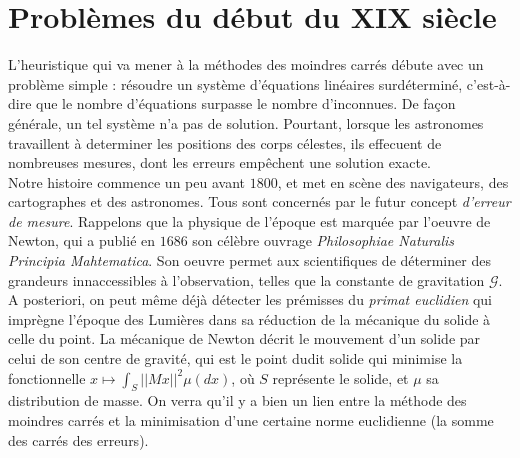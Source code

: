 \documentclass{article}
\begin{document}
\section{Problèmes du début du XIX siècle}

L'heuristique qui va mener à la méthodes des moindres carrés débute avec un problème simple : résoudre un système d'équations linéaires surdéterminé, c'est-à-dire que le nombre d'équations surpasse le nombre d'inconnues. De façon générale, un tel système n'a pas de solution. Pourtant, lorsque les astronomes travaillent à determiner les positions des corps célestes, ils effecuent de nombreuses mesures, dont les erreurs empêchent une solution exacte.\\

Notre histoire commence un peu avant $1800$, et met en scène des navigateurs, des cartographes et des astronomes. Tous sont concernés par le futur concept \textit{d'erreur de mesure}. Rappelons que la physique de l'époque est marquée par l'oeuvre de Newton, qui a publié en $1686$ son célèbre ouvrage \textit{Philosophiae Naturalis Principia Mahtematica}. Son oeuvre permet aux scientifiques de déterminer des grandeurs innaccessibles à l'observation, telles que la constante de gravitation $\mathcal G$. \\

A posteriori, on peut même déjà détecter les prémisses du \textit{primat euclidien} qui imprègne l'époque des Lumières dans sa réduction de la mécanique du solide à celle du point. La mécanique de Newton décrit le mouvement d'un solide par celui de son centre de gravité, qui est le point dudit solide qui minimise la fonctionnelle $x\mapsto \int_S ||Mx||^2 \mu(dx)$, où $S$ représente le solide, et $\mu$ sa distribution de masse. On verra qu'il y a bien un lien entre la méthode des moindres carrés et la minimisation d'une certaine norme euclidienne (la somme des carrés des erreurs).\\ 
\end{document}
